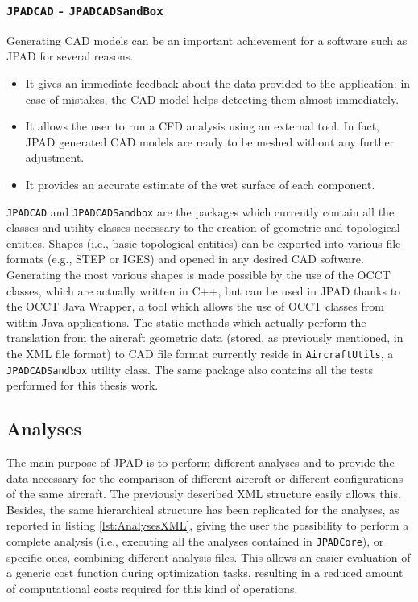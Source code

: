 \subsubsection{\texttt{JPADCAD} - \texttt{JPADCADSandBox}}
Generating \gls{CAD} models can be an important achievement for a software such as \gls{JPAD} for several reasons.
%
\begin{itemize}
\item It gives an immediate feedback about the data provided to the application: in case of mistakes, the \gls{CAD} model helps detecting them almost immediately.
\item It allows the user to run a \gls{CFD} analysis using an external tool. In fact, \gls{JPAD} generated \gls{CAD} models are ready to be meshed without any further adjustment.
\item It provides an accurate estimate of the wet surface of each component.
\end{itemize}
%
\lstinline[language=Java]!JPADCAD! and \lstinline[language=Java]!JPADCADSandbox! are the packages which currently contain all the classes and utility classes necessary to the creation of geometric and topological entities. Shapes (i.e., basic topological entities) can be exported into various file formats (e.g., STEP or IGES) and opened in any desired \gls{CAD} software. Generating the most various shapes is made possible by the use of the \gls{OCCT} classes, which are actually written in C++, but can be used in \gls{JPAD} thanks to the \gls{OCCT} Java Wrapper, a tool which allows the use of \gls{OCCT} classes from within Java applications. The static methods which actually perform the translation from the aircraft geometric data (stored, as previously mentioned, in the XML file format) to CAD file format currently reside in \lstinline[language=Java]!AircraftUtils!, a \lstinline[language=Java]!JPADCADSandbox! utility class. The same package also contains all the tests performed for this thesis work.

\subsection{Analyses}
\label{sec1.3}

The main purpose of \gls{JPAD} is to perform different analyses and to provide the data necessary for the comparison of different aircraft or different configurations of the same aircraft. The previously described XML structure easily allows this. Besides, the same hierarchical structure has been replicated for the analyses, as reported in listing \ref{lst:AnalysesXML}, giving the user the possibility to perform a complete analysis (i.e., executing all the analyses contained in \lstinline[language=Java]!JPADCore!), or specific ones, combining different analysis files. This allows an easier evaluation of a generic cost function during optimization tasks, resulting in a reduced amount of computational costs required for this kind of operations.

